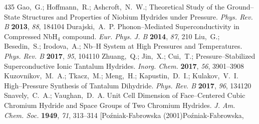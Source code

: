 \documentclass[12pt,letterpaper,oneside]{article}
\begin{document}
\begin{mcitethebibliography}{435}
{\mcitedefaultendpunct}{\mcitedefaultseppunct}\relax
\EndOfBibitem
{}
Gao,~G.; Hoffmann,~R.; Ashcroft,~N.~W.; 
  Theoretical Study of the Ground--State Structures and Properties of Niobium
  Hydrides under Pressure. \emph{Phys. Rev. B} \textbf{2013}, \emph{88},
  184104\relax
\mciteBstWouldAddEndPuncttrue
\mciteSetBstMidEndSepPunct{\mcitedefaultmidpunct}
{\mcitedefaultendpunct}{\mcitedefaultseppunct}\relax
\EndOfBibitem
{}
Durajski,~A.~P. Phonon--Mediated Superconductivity in Compressed NbH$_4$
  compound. \emph{Eur. Phys. J. B} \textbf{2014}, \emph{87}, 210\relax
\mciteBstWouldAddEndPuncttrue
\mciteSetBstMidEndSepPunct{\mcitedefaultmidpunct}
{\mcitedefaultendpunct}{\mcitedefaultseppunct}\relax
\EndOfBibitem
{}
Liu,~G.; Besedin,~S.; Irodova,~A.;   Nb--H
  System at High Pressures and Temperatures. \emph{Phys. Rev. B} \textbf{2017},
  \emph{95}, 104110\relax
\mciteBstWouldAddEndPuncttrue
\mciteSetBstMidEndSepPunct{\mcitedefaultmidpunct}
{\mcitedefaultendpunct}{\mcitedefaultseppunct}\relax
\EndOfBibitem
{}
Zhuang,~Q.; Jin,~X.; Cui,~T.; 
  Pressure--Stabilized Superconductive Ionic Tantalum Hydrides. \emph{Inorg.
  Chem.} \textbf{2017}, \emph{56}, 3901--3908\relax
\mciteBstWouldAddEndPuncttrue
\mciteSetBstMidEndSepPunct{\mcitedefaultmidpunct}
{\mcitedefaultendpunct}{\mcitedefaultseppunct}\relax
\EndOfBibitem
{}
Kuzovnikov,~M.~A.; Tkacz,~M.; Meng,~H.; Kapustin,~D.~I.; Kulakov,~V.~I.
  High--Pressure Synthesis of Tantalum Dihydride. \emph{Phys. Rev. B}
  \textbf{2017}, \emph{96}, 134120\relax
\mciteBstWouldAddEndPuncttrue
\mciteSetBstMidEndSepPunct{\mcitedefaultmidpunct}
{\mcitedefaultendpunct}{\mcitedefaultseppunct}\relax
\EndOfBibitem
{}
Snavely,~C.~A.; Vaughan,~D.~A. Unit Cell Dimension of Face--Centered Cubic
  Chromium Hydride and Space Groups of Two Chromium Hydrides. \emph{J. Am.
  Chem. Soc.} \textbf{1949}, \emph{71}, 313--314\relax
\mciteBstWouldAddEndPuncttrue
\mciteSetBstMidEndSepPunct{\mcitedefaultmidpunct}
{\mcitedefaultendpunct}{\mcitedefaultseppunct}\relax
\EndOfBibitem
\bibitem[Po{\'z}niak-Fabrowska (2001)Po{\'z}niak-Fabrowska,

\end{mcitethebibliography}
\end{document}
